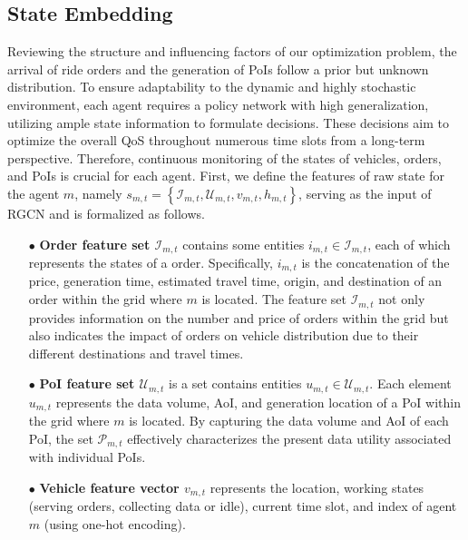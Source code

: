 \subsection{State Embedding}
Reviewing the structure and influencing factors of our optimization problem, the arrival of ride orders and the generation of PoIs follow a prior but unknown distribution. To ensure adaptability to the dynamic and highly stochastic environment, each agent requires a policy network with high generalization, utilizing ample state information to formulate decisions. These decisions aim to optimize the overall QoS throughout numerous time slots from a long-term perspective. Therefore, continuous monitoring of the states of vehicles, orders, and PoIs is crucial for each agent. First, we define the features of raw state for the agent $m$, namely $s_{m,t} = \left\{ \mathcal{I}_{m,t}, \mathcal{U}_{m,t}, v_{m,t}, h_{m,t} \right\}$, serving as the input of RGCN and is formalized as follows.

\begin{itemize}
\item[$\bullet$] 
\textbf{Order feature set $\mathcal{I}_{m,t}$} contains some entities $i_{m,t} \in \mathcal{I}_{m,t}$, each of which represents the states of a order. Specifically, $i_{m,t}$ is the concatenation of the price, generation time, estimated travel time, origin, and destination of an order within the grid where $m$ is located. The feature set $\mathcal{I}_{m,t}$ not only provides information on the number and price of orders within the grid but also indicates the impact of orders on vehicle distribution due to their different destinations and travel times.
\end{itemize}

\begin{itemize}
\item[$\bullet$] 
\textbf{PoI feature set ${\mathcal{U}}_{m,t}$} is a set contains entities $u_{m,t} \in \mathcal{U}_{m,t}$. Each element $u_{m,t}$ represents the data volume, AoI, and generation location of a PoI within the grid where $m$ is located. By capturing the data volume and AoI of each PoI, the set ${\mathcal{P}}_{m,t}$ effectively characterizes the present data utility associated with individual PoIs.
\end{itemize}

\begin{itemize}
\item[$\bullet$] 
\textbf{Vehicle feature vector $v_{m,t}$} represents the location, working states (serving orders, collecting data or idle), current time slot, and index of agent $m$ (using one-hot encoding). 
\end{itemize}

